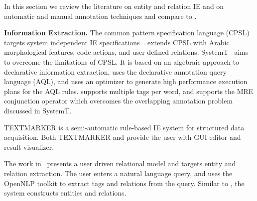 In this section we review the literature on entity and relation IE 
and on automatic and manual annotation techniques 
and compare to \framework.


{\bf Information Extraction.}
The common pattern specification language (CPSL) targets system independent IE specifications~\cite{appelt1998common}. 
\framework extends CPSL with Arabic morphological features, code actions, and user defined relations.
SystemT~\cite{chiticariu2010systemt} aims to overcome the 
limitations of CPSL. 
It is based on an algebraic approach to declarative information extraction, 
uses the declarative annotation query language (AQL), 
and uses an optimizer to generate high performance execution plans for the AQL rules.
\framework supports multiple tags per word, and supports the MRE conjunction operator which overcomes the overlapping annotation problem discussed in SystemT.

TEXTMARKER is a semi-automatic rule-based IE system 
for structured data acquisition\cite{atzmueller2008rule}.
Both TEXTMARKER and \framework provide the user with GUI editor and result visualizer.

The work in~\cite{urbain2012user} presents a user 
driven relational model and targets entity and relation extraction. 
The user enters a natural language query, and uses the OpenNLP toolkit to 
extract tags and relations from the query. 
Similar to \framework, the system constructs entities and relations. 

